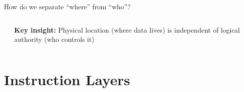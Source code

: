 \documentclass[handout,aspectratio=169,xcolor=dvipsnames,10pt]{beamer}
\begin{document}
\begin{frame}[fragile]{How do we separate ``where'' from ``who''?}
\begin{columns}[T]
\begin{center}
\end{center}

\vspace{0.5em}

{\footnotesize\textbf{Key insight:} Physical location (where data lives) is independent of logical authority (who controls it)}
\vfill

\end{columns}

\end{frame}



\section{Instruction Layers}
\end{document}
